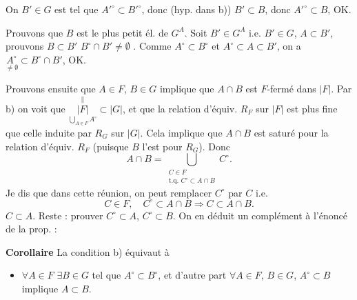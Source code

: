 \documentclass[11pt,a4paper]{article}
\begin{document}
On  $B' \in G$ est tel que $A'^{\circ} \subset B'^{\circ}$, donc  (hyp. dans b)) $B' \subset B$, donc $A'^{\circ} \subset B$, OK.

Prouvons que $B$ est le plus petit él. de $G^{A}$. Soit $B' \in G^{A}$ i.e. $B' \in G$, $A \subset B'$, prouvons $B \subset B'$  $B^{\circ} \cap B' \neq \emptyset$ . Comme $A^{\circ} \subset B^{\circ}$ et $A^{\circ} \subset A \subset B'$, on a $\underset{\neq \emptyset}{A^{\circ}} \subset B^{\circ} \cap B'$, OK.

Prouvons ensuite que $A \in F$, $B \in G$ implique que $A \cap B$ est $F$-fermé dans $|F|$. Par b) on voit que $\underset{\displaystyle \bigcup_{A \in F} A^{\circ}}{\overset{\|}{|F|}} \subset |G|$, et que la relation d'équiv. $R_{F}$ sur $|F|$ est plus fine que celle induite par $R_{G}$ sur $|G|$. Cela implique que $A \cap B$ est saturé pour la relation d'équiv. $R_{F}$ (puisque $B$ l'est pour $R_{G}$). Donc
\[
  A \cap B = \bigcup_{\substack{C \in F \\ \text{t.q. } C^{\circ} \subset A \cap B}} C^{\circ} .
\]
Je dis que \struck{\ill{}} dans cette réunion, \struck{\ill{}} on peut remplacer $C^{\circ}$ par $C$ i.e.
\[
  C \in F, \quad C^{\circ} \subset A \cap B \Longrightarrow C \subset A \cap B .
\]
$C \subset A$. Reste : prouver \struck{\ill{}} \ill{} $C^{\circ} \subset A$, \ill{} $C^{\circ} \subset B$. On en déduit un complément à l'énoncé de la prop. :

\textbf{Corollaire} La condition b) équivaut à
\begin{itemize}
  \item[b')] $\forall A \in F$ $\exists B \in G$ tel que $A^{\circ} \subset B^{\circ}$, et d'autre part $\forall A \in F$, $B \in G$, $A^{\circ} \subset B$ implique $A \subset B$.
\end{itemize}
\end{document}
